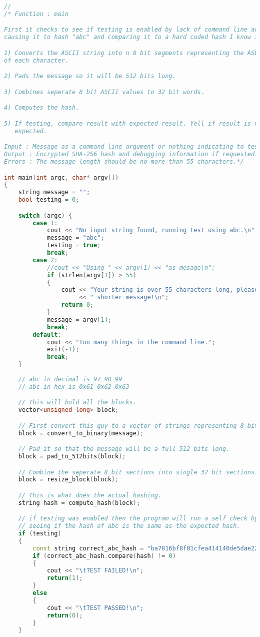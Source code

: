\begin{lstlisting}[language = C++]
// 
/* Function : main

First it checks to see if testing is enabled by lack of command line arguments,
causing it to hash "abc" and comparing it to a hard coded hash I know is correct.

1) Converts the ASCII string into n 8 bit segments representing the ASCII value
of each character.

2) Pads the message so it will be 512 bits long.

3) Combines seperate 8 bit ASCII values to 32 bit words.

4) Computes the hash.

5) If testing, compare result with expected result. Yell if result is not as
   expected.

Input : Message as a command line argument or nothing indicating to test.
Output : Encrypted SHA-256 hash and debugging information if requested.
Errors : The message length should be no more than 55 characters.*/

int main(int argc, char* argv[])
{
	string message = "";
	bool testing = 0;

	switch (argc) {
	    case 1:
	        cout << "No input string found, running test using abc.\n";
			message = "abc";
			testing = true;
	        break;
	    case 2:
	        //cout << "Using " << argv[1] << "as mesage\n";
	    	if (strlen(argv[1]) > 55)
	    	{
	    		cout << "Your string is over 55 characters long, please use a"
	    			 << " shorter message!\n";
	    		return 0;
	    	}
	        message = argv[1];
	        break;
	    default:
	        cout << "Too many things in the command line.";
	        exit(-1);
	        break;
	}
	
	// abc in decimal is 97 98 99
	// abc in hex is 0x61 0x62 0x63

	// This will hold all the blocks.
	vector<unsigned long> block;

	// First convert this guy to a vector of strings representing 8 bit variables.
	block = convert_to_binary(message);

	// Pad it so that the message will be a full 512 bits long.
	block = pad_to_512bits(block);

	// Combine the seperate 8 bit sections into single 32 bit sections.
	block = resize_block(block);

	// This is what does the actual hashing.
	string hash = compute_hash(block);

	// if testing was enabled then the program will run a self check by
	// seeing if the hash of abc is the same as the expected hash.
	if (testing)
	{
		const string correct_abc_hash = "ba7816bf8f01cfea414140de5dae2223b00361a396177a9cb410ff61f20015ad";
		if (correct_abc_hash.compare(hash) != 0)
		{
			cout << "\tTEST FAILED!\n";
			return(1);
		}
		else
		{
			cout << "\tTEST PASSED!\n";
			return(0);
		}
	}
	

\end{lstlisting}
